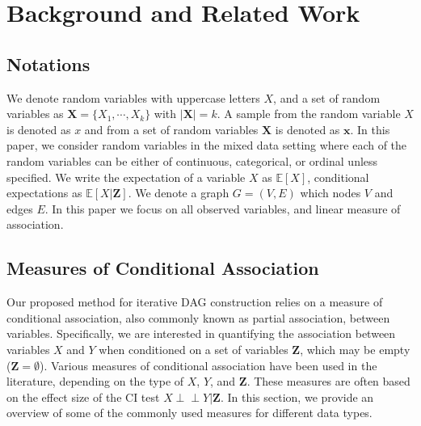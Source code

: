 \documentclass{uai2025} %
\def\ci{\perp\!\!\!\!\!\perp}
\begin{document}

\section{Background and Related Work}
\label{sec:background}
\subsection{Notations}
We denote random variables with uppercase letters $ X $, and a set of random
variables as $ \bm{X} = \{X_1, \cdots, X_k\} $ with $ \rvert \bm{X} \rvert = k
$. A sample from the random variable $ X $ is denoted as $ x $ and from a set
of random variables $ \bm{X} $ is denoted as $ \bm{x} $. In this paper, we
consider random variables in the mixed data setting where each of the random
variables can be either of continuous, categorical, or ordinal unless
specified. We write the expectation of a variable $ X $ as $ \mathbb{E}[X] $,
conditional expectations as $ \mathbb{E}[X | \bm{Z}] $. We denote a graph $ G =
(V, E) $ which nodes $ V$ and edges $ E $. In this paper we focus on all
observed variables, and linear measure of association.

\subsection{Measures of Conditional Association}
Our proposed method for iterative DAG construction relies on a measure of
conditional association, also commonly known as partial association, between
variables. Specifically, we are interested in quantifying the association
between variables $ X $ and $ Y $ when conditioned on a set of variables $
\bm{Z} $, which may be empty ($ \bm{Z} = \emptyset $). Various measures of
conditional association have been used in the literature, depending on the type
of $ X $, $ Y $, and $ \bm{Z} $. These measures are often based on the effect
size of the CI test $ X \ci Y \rvert \bm{Z} $. In this section, we provide an
overview of some of the commonly used measures for different data types.
\end{document}
